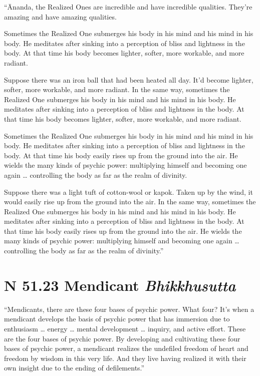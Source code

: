 \documentclass[12pt,openany]{book}%
\newcommand*{\suttatitleacronym}[1]{\smaller[2]{#1}\vspace*{.3em}}
\newcommand*{\suttatitletranslation}[1]{\linebreak{#1}}
\newcommand*{\suttatitleroot}[1]{\linebreak\smaller[2]\itshape{#1}}
\newcommand*{\tocacronym}[1]{\hspace*{-3.3em}{#1}\quad}
\newcommand*{\toctranslation}[1]{#1}
\newcommand*{\tocroot}[1]{(\textit{#1})}
\begin{document}
“Ānanda, the Realized Ones are incredible and have incredible qualities. They’re amazing and have amazing qualities. 

Sometimes the Realized One submerges his body in his mind and his mind in his body. He meditates after sinking into a perception of bliss and lightness in the body. At that time his body becomes lighter, softer, more workable, and more radiant. 

Suppose there was an iron ball that had been heated all day. It’d become lighter, softer, more workable, and more radiant. In the same way, sometimes the Realized One submerges his body in his mind and his mind in his body. He meditates after sinking into a perception of bliss and lightness in the body. At that time his body becomes lighter, softer, more workable, and more radiant. 

Sometimes the Realized One submerges his body in his mind and his mind in his body. He meditates after sinking into a perception of bliss and lightness in the body. At that time his body easily rises up from the ground into the air. He wields the many kinds of psychic power: multiplying himself and becoming one again … controlling the body as far as the realm of divinity. 

Suppose there was a light tuft of cotton-wool or kapok. Taken up by the wind, it would easily rise up from the ground into the air. In the same way, sometimes the Realized One submerges his body in his mind and his mind in his body. He meditates after sinking into a perception of bliss and lightness in the body. At that time his body easily rises up from the ground into the air. He wields the many kinds of psychic power: multiplying himself and becoming one again … controlling the body as far as the realm of divinity.” 

%
\section*{{\suttatitleacronym SN 51.23}{\suttatitletranslation A Mendicant }{\suttatitleroot Bhikkhusutta}}
\addcontentsline{toc}{section}{\tocacronym{SN 51.23} \toctranslation{A Mendicant } \tocroot{Bhikkhusutta}}

“Mendicants, there are these four bases of psychic power. What four? It’s when a mendicant develops the basis of psychic power that has immersion due to enthusiasm … energy … mental development … inquiry, and active effort. These are the four bases of psychic power. By developing and cultivating these four bases of psychic power, a mendicant realizes the undefiled freedom of heart and freedom by wisdom in this very life. And they live having realized it with their own insight due to the ending of defilements.” 
\end{document}
